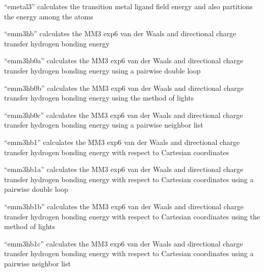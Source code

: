 \documentclass[letterpaper,11pt,english]{sphinxmanual}
\begin{document}
\sphinxAtStartPar
“emetal3” calculates the transition metal ligand field energy and also partitions the energy among the atoms

\sphinxAtStartPar
{}

\sphinxAtStartPar
“emm3hb” calculates the MM3 exp\sphinxhyphen{}6 van der Waals and directional charge transfer hydrogen bonding energy

\sphinxAtStartPar
{}

\sphinxAtStartPar
“emm3hb0a” calculates the MM3 exp\sphinxhyphen{}6 van der Waals and directional charge transfer hydrogen bonding energy using a pairwise double loop

\sphinxAtStartPar
{}

\sphinxAtStartPar
“emm3hb0b” calculates the MM3 exp\sphinxhyphen{}6 van der Waals and directional charge transfer hydrogen bonding energy using the method of lights

\sphinxAtStartPar
{}

\sphinxAtStartPar
“emm3hb0c” calculates the MM3 exp\sphinxhyphen{}6 van der Waals and directional charge transfer hydrogen bonding energy using a pairwise neighbor list

\sphinxAtStartPar
{}

\sphinxAtStartPar
“emm3hb1” calculates the MM3 exp\sphinxhyphen{}6 van der Waals and directional charge transfer hydrogen bonding energy with respect to Cartesian coordinates

\sphinxAtStartPar
{}

\sphinxAtStartPar
“emm3hb1a” calculates the MM3 exp\sphinxhyphen{}6 van der Waals and directional charge transfer hydrogen bonding energy with respect to Cartesian coordinates using a pairwise double loop

\sphinxAtStartPar
{}

\sphinxAtStartPar
“emm3hb1b” calculates the MM3 exp\sphinxhyphen{}6 van der Waals and directional charge transfer hydrogen bonding energy with respect to Cartesian coordinates using the method of lights

\sphinxAtStartPar
{}

\sphinxAtStartPar
“emm3hb1c” calculates the MM3 exp\sphinxhyphen{}6 van der Waals and directional charge transfer hydrogen bonding energy with respect to Cartesian coordinates using a pairwise neighbor list
\end{document}
